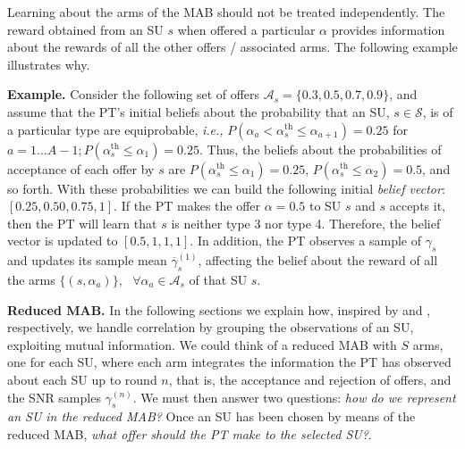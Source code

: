 Learning about the arms of the MAB should not be treated independently.
The reward obtained from an SU $s$ when offered a particular $\alpha$ provides information about the rewards of all the other offers / associated arms. The following example illustrates why. 

\textbf{Example.}
Consider the following set of offers $\mathcal{A}_s = \{0.3,0.5,0.7,0.9\}$, and assume that the PT's initial beliefs about the probability that an SU, $s\in\mathcal{S}$, is of a particular type are equiprobable, \textit{i.e.,} $P(\alpha_a < \alpha_s^{\text{th}}\leq \alpha_{a+1})=0.25$ for $a=1\ldots A-1; P(\alpha_s^{\text{th}} \leq \alpha_1) = 0.25$. %
Thus, the beliefs about the probabilities of acceptance of each offer by $s$ are $P(\alpha_s^{\text{th}}\leq \alpha_1) = 0.25$, $P(\alpha_s^{\text{th}}\leq \alpha_2) = 0.5$, and so forth.
With these probabilities we can build the following initial \textit{belief vector}: $[0.25,0.50,0.75,1]$.
If the PT makes the offer $\alpha = 0.5$ to SU $s$ and $s$ accepts it, then the PT will learn that $s$ is neither type 3 nor type 4. Therefore, the belief vector is updated to $[0.5,1,1,1]$.
In addition, the PT observes a sample of $\gamma_s$ and updates its sample mean $\overline\gamma_s^{(1)}$, affecting the belief about the reward of all the arms $\{(s,\alpha_a)\},\text{ } \forall \alpha_a \in \mathcal{A}_s$ of that SU $s$.

\textbf{Reduced MAB.} In the following sections we explain how, inspired by \cite{ref:Pandey2007} and \cite{ref:Brown2013}, respectively, we handle correlation by grouping the observations of an SU, exploiting mutual information. 
We could think of a reduced MAB with $S$ arms, one for each SU, where each arm integrates the information the PT has observed about each SU up to round $n$, that is, the acceptance and rejection of offers, and the SNR samples $\gamma_s^{(n)}$. We must then answer two questions: \textit{how do we represent an SU in the reduced MAB?} Once an SU has been chosen by means of the reduced MAB, \textit{what offer should the PT make to the selected SU?}.

